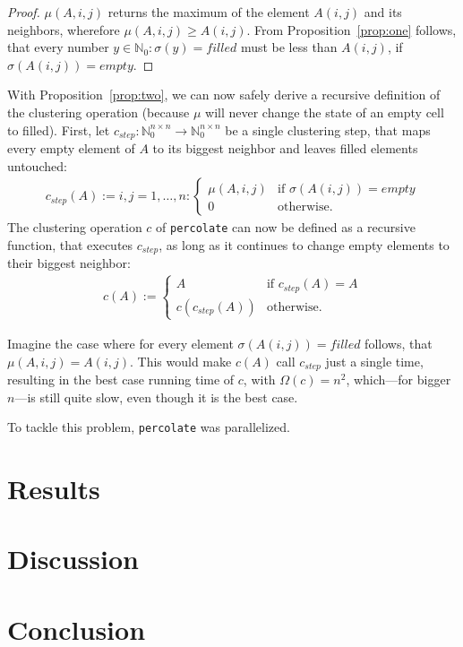 \documentclass[twoside,11pt]{article}
\def\perc{\texttt{perco\-late}}
\begin{document}
\begin{proof}
  $\mu(A, i, j)$ returns the maximum of the element
  $A(i, j)$ and its neighbors, wherefore $\mu(A, i, j) \geq
  A(i, j)$.
  From Proposition~\ref{prop:one} follows, that every
  number $y \in \mathbb{N}_0: \sigma(y) = filled$ must be
  less than $A(i, j)$, if $\sigma(A(i,j)) = empty$.
\end{proof}

With Proposition~\ref{prop:two}, we can now safely derive
a recursive definition of the clustering operation (because
$\mu$ will never change the state of an empty cell to
filled).
First, let $c_{step}:\mathbb{N}_0^{n \times n} \rightarrow
\mathbb{N}_0^{n \times n}$ be a single clustering step,
that maps every empty element of $A$ to its biggest
neighbor and leaves filled elements untouched:
\begin{align*}
  c_{step}(A) := i,j=1,\dots,n: \begin{cases}
    \mu(A, i, j) &\text{if } \sigma(A(i, j)) = empty \\
    0 &\text{otherwise}.
  \end{cases}
\end{align*}
The clustering operation $c$ of \perc{} can now be defined
as a recursive function, that executes $c_{step}$, as long
as it continues to change empty elements to their biggest
neighbor:
\begin{align*}
  c(A) := \begin{cases}
    A &\text{if } c_{step}(A) = A \\
    c(c_{step}(A)) &\text{otherwise}.
  \end{cases}
\end{align*}

Imagine the case where for every element
$\sigma(A(i,j)) = filled$ follows, that
$\mu(A, i, j) = A(i, j)$.
This would make $c(A)$ call $c_{step}$ just a single time,
resulting in the best case running time of $c$, with
$\Omega(c) = n^2$, which---for bigger $n$---is still quite
slow, even though it is the best case.

To tackle this problem, \perc{} was parallelized.




\section{Results} %





\section{Discussion} %


\section{Conclusion} %



\end{document}
